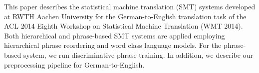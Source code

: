 This paper describes the statistical machine translation (SMT) systems developed at RWTH Aachen University for the German-to-English translation task of the ACL 2014 Eighth Workshop on Statistical Machine Translation (WMT 2014). Both hierarchical and phrase-based SMT systems are applied employing hierarchical phrase reordering and word class language models. For the phrase-based system, we run discriminative phrase training. In addition, we describe our preprocessing pipeline for German-to-English.

